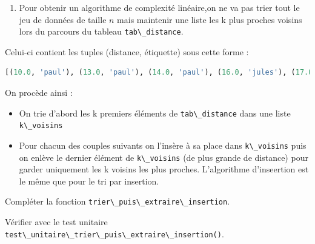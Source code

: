 \documentclass[
  11pt,
]{article}
\newcommand{\passthrough}[1]{#1}
\providecommand{\tightlist}{%
  \setlength{\itemsep}{0pt}\setlength{\parskip}{0pt}}
\newcounter{thme}
\newcounter{def}
\newcounter{cours}
\newcounter{alg}
\begin{document}
\begin{enumerate}
\def\labelenumi{\arabic{enumi}.}
\setcounter{enumi}{4}
\tightlist
\item
  Pour obtenir un algorithme de complexité linéaire,on ne va pas trier
  tout le jeu de données de taille \(n\) mais maintenir une liste les k
  plus proches voisins lors du parcours du tableau
  \passthrough{\lstinline!tab\_distance!}.
\end{enumerate}

Celui-ci contient les tuples (distance, étiquette) sous cette forme :

\begin{lstlisting}[language=Python]
[(10.0, 'paul'), (13.0, 'paul'), (14.0, 'paul'), (16.0, 'jules'), (17.0, 'paul'), ...]
\end{lstlisting}

On procède ainsi :

\begin{itemize}
\tightlist
\item
  On trie d'abord les k premiers éléments de
  \passthrough{\lstinline!tab\_distance!} dans une liste
  \passthrough{\lstinline!k\_voisins!}
\item
  Pour chacun des couples suivants on l'insère à sa place dans
  \passthrough{\lstinline!k\_voisins!} puis on enlève le dernier élément
  de \passthrough{\lstinline!k\_voisins!} (de plus grande de distance)
  pour garder uniquement les k voisins les plus proches. L'algorithme
  d'inseertion est le même que pour le tri par insertion.
\end{itemize}

Compléter la fonction
\passthrough{\lstinline!trier\_puis\_extraire\_insertion!}.

Vérifier avec le test unitaire
\passthrough{\lstinline!test\_unitaire\_trier\_puis\_extraire\_insertion()!}.
\end{document}
